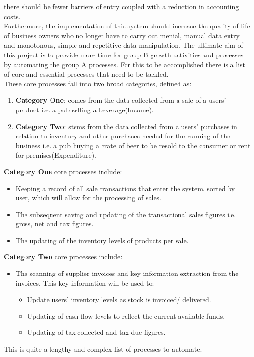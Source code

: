 \begin{flushleft}
	there should be fewer barriers of entry coupled with a reduction in accounting costs. \\
	Furthermore, the implementation of this system should increase the quality of life of business owners who no longer have to carry out menial, manual data entry and monotonous, simple and
	repetitive data manipulation.
	\bigbreak
	The ultimate aim of this project is to provide more time for group B growth activities and processes by automating the group A processes. For this to be accomplished there is a list of
	core and essential processes that need to be tackled. \\
	These core processes fall into two broad categories, defined as:
	\begin{enumerate}
		\item \textbf{Category One}: comes from the data collected from a sale of a users' product i.e. a pub selling a beverage(Income).
		\item \textbf{Category Two}: stems from the data collected from a users' purchases in relation to inventory and other purchases needed for the running of the business
		      i.e. a pub buying a crate of beer to be resold to the consumer or rent for premises(Expenditure).
	\end{enumerate}
	\textbf{Category One} core processes include:
	\begin{itemize}
		\item Keeping a record of all sale transactions that enter the system, sorted by user, which will allow for the processing of sales.
		\item The subsequent saving and updating of the transactional sales figures i.e. gross, net and tax figures.
		\item The updating of the inventory levels of products per sale.
	\end{itemize}
	\textbf{Category Two} core processes include:
	\begin{itemize}
		\item The scanning of supplier invoices and key information extraction from the invoices. This key information will be used to:
		      \begin{itemize}
			      \item Update users' inventory levels as stock is invoiced/ delivered.
			      \item Updating of cash flow levels to reflect the current available funds.
			      \item Updating of tax collected and tax due figures.
		      \end{itemize}
	\end{itemize}
	This is quite a lengthy and complex list of processes to automate.

\end{flushleft}
